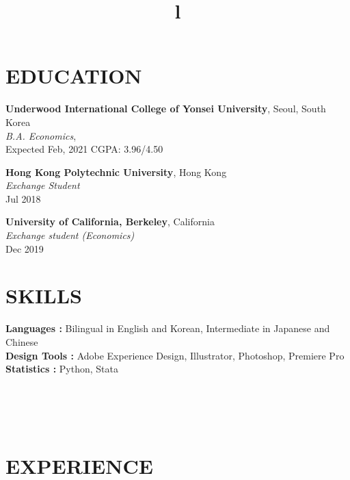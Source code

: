 \documentclass[margin]{res}
\begin{document}
\begin{resume}

\section{EDUCATION}
\textbf{Underwood International College of Yonsei University}, Seoul, South Korea\\
{\sl B.A. Economics},\\
Expected Feb, 2021
\hfill CGPA: 3.96/4.50

\textbf{Hong Kong Polytechnic University}, Hong Kong \\
{\sl Exchange Student}\\
Jul 2018

\textbf{University of California, Berkeley}, California \\
{\sl Exchange student (Economics)}\\
Dec 2019


\section{SKILLS}

\textbf{Languages :} Bilingual in English and Korean, Intermediate in Japanese and Chinese
\\
\textbf{Design Tools :} Adobe Experience Design, Illustrator, Photoshop, Premiere Pro
\\
\textbf{Statistics :} Python, Stata

\begin{format}
\title{l}\\
\\
\body\\
\end{format}

\section{EXPERIENCE}


\end{resume}
\end{document}
